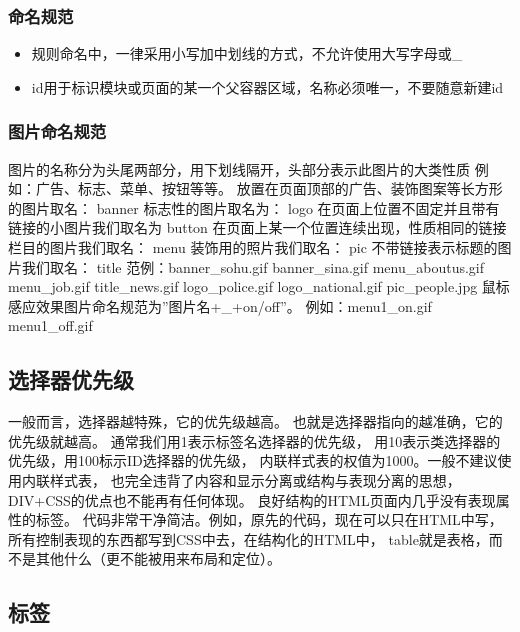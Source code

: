\documentclass{book}
\begin{document}
\subsubsection{命名规范}

\begin{itemize}
\item{规则命名中，一律采用小写加中划线的方式，不允许使用大写字母或\_}
\item{id用于标识模块或页面的某一个父容器区域，名称必须唯一，不要随意新建id}
\end{itemize}

\subsubsection{图片命名规范}

图片的名称分为头尾两部分，用下划线隔开，头部分表示此图片的大类性质
例如：广告、标志、菜单、按钮等等。
放置在页面顶部的广告、装饰图案等长方形的图片取名： banner
标志性的图片取名为： logo
在页面上位置不固定并且带有链接的小图片我们取名为 button
在页面上某一个位置连续出现，性质相同的链接栏目的图片我们取名： menu
装饰用的照片我们取名： pic
不带链接表示标题的图片我们取名： title
范例：banner\_sohu.gif  banner\_sina.gif  menu\_aboutus.gif  menu\_job.gif  title\_news.gif  logo\_police.gif   logo\_national.gif   pic\_people.jpg
鼠标感应效果图片命名规范为”图片名+\_+on/off”。
例如：menu1\_on.gif  menu1\_off.gif

\subsection{选择器优先级}

一般而言，选择器越特殊，它的优先级越高。
也就是选择器指向的越准确，它的优先级就越高。
通常我们用1表示标签名选择器的优先级，
用10表示类选择器的优先级，用100标示ID选择器的优先级，
内联样式表的权值为1000。一般不建议使用内联样式表，
也完全违背了内容和显示分离或结构与表现分离的思想，
DIV+CSS的优点也不能再有任何体现。
良好结构的HTML页面内几乎没有表现属性的标签。
代码非常干净简洁。例如，原先的代码，现在可以只在HTML中写，
所有控制表现的东西都写到CSS中去，在结构化的HTML中， 
table就是表格，而不是其他什么（更不能被用来布局和定位）。

\subsection{标签}
\end{document}
